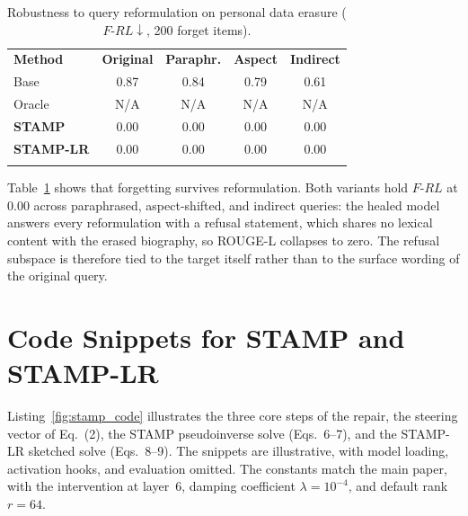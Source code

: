 \begin{table}[H]
\centering
\caption{Robustness to query reformulation on personal data erasure ($F\text{-}RL\downarrow$, 200 forget items).}
\label{tab:robustness}
\small
\renewcommand{\arraystretch}{1.2}
\begin{tabular}{l|cccc}
\Xhline{1.15pt}
\textbf{Method} & \textbf{Original} & \textbf{Paraphr.} & \textbf{Aspect} & \textbf{Indirect} \\
\Xhline{1.15pt}
Base     & 0.87 & 0.84 & 0.79 & 0.61 \\
\rowcolor{gray!15}
Oracle   & N/A & N/A & N/A & N/A \\
\textbf{STAMP}    & 0.00 & 0.00 & 0.00 & 0.00 \\
\rowcolor{gray!15}
\textbf{STAMP-LR} & 0.00 & 0.00 & 0.00 & 0.00 \\
\Xhline{1.15pt}
\end{tabular}
\end{table}

Table~\ref{tab:robustness} shows that forgetting survives reformulation. Both variants hold $F\text{-}RL$ at 0.00 across paraphrased, aspect-shifted, and indirect queries: the healed model answers every reformulation with a refusal statement, which shares no lexical content with the erased biography, so ROUGE-L collapses to zero. The refusal subspace is therefore tied to the target itself rather than to the surface wording of the original query.

\section{Code Snippets for STAMP and STAMP-LR}
\label{sup:code}
Listing~\ref{fig:stamp_code} illustrates the three core steps of the repair, the steering vector of Eq.~(2), the STAMP pseudoinverse solve (Eqs.~6--7), and the STAMP-LR sketched solve (Eqs.~8--9). The snippets are illustrative, with model loading, activation hooks, and evaluation omitted. The constants match the main paper, with the intervention at layer~6, damping coefficient $\lambda = 10^{-4}$, and default rank $r = 64$.


